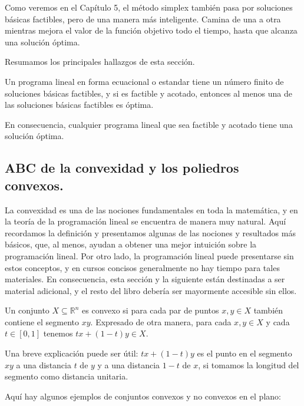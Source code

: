 \documentclass{article}
\begin{document}
Como veremos en el Capítulo 5, el método simplex también pasa por soluciones básicas factibles, pero de una manera más inteligente. Camina de una a otra mientras mejora el valor de la función objetivo todo el tiempo, hasta que alcanza una solución óptima.

Resumamos los principales hallazgos de esta sección.

\begin{tcolorbox}[colback=white, colframe=black, title=Conclusión de la Sección]
Un programa lineal en forma ecuacional o estandar tiene un número finito de soluciones básicas factibles, y si es factible y acotado, entonces al menos una de las soluciones básicas factibles es óptima.

En consecuencia, cualquier programa lineal que sea factible y acotado tiene una solución óptima.
\end{tcolorbox}
\newpage 
\subsection{ABC de la convexidad y los poliedros convexos.}
La convexidad es una de las nociones fundamentales en toda la matemática, y en la teoría de la programación lineal se encuentra de manera muy natural. Aquí recordamos la definición y presentamos algunas de las nociones y resultados más básicos, que, al menos, ayudan a obtener una mejor intuición sobre la programación lineal. Por otro lado, la programación lineal puede presentarse sin estos conceptos, y en cursos concisos generalmente no hay tiempo para tales materiales. En consecuencia, esta sección y la siguiente están destinadas a ser material adicional, y el resto del libro debería ser mayormente accesible sin ellos.

\begin{tcolorbox}[colback=white!10!white, colframe=black, title=Definición de Conjunto Convexo]
Un conjunto \( X \subseteq \mathbb{R}^n \) es convexo si para cada par de puntos \( x, y \in X \) también contiene el segmento \( xy \). Expresado de otra manera, para cada \( x, y \in X \) y cada \( t \in [0, 1] \) tenemos \( tx + (1-t)y \in X \).
\end{tcolorbox}

Una breve explicación puede ser útil: \( tx + (1-t)y \) es el punto en el segmento \( xy \) a una distancia \( t \) de \( y \) y a una distancia \( 1-t \) de \( x \), si tomamos la longitud del segmento como distancia unitaria.

Aquí hay algunos ejemplos de conjuntos convexos y no convexos en el plano: 
\end{document}
